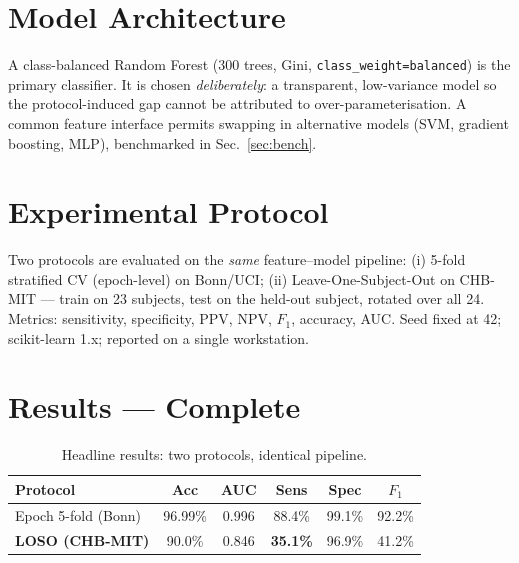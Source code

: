 \documentclass[10pt,journal,twocolumn]{IEEEtran}
\begin{document}
\section{Model Architecture}
A class-balanced Random Forest (300 trees, Gini, \texttt{class\_weight=balanced}) is the primary classifier. It is chosen \emph{deliberately}: a transparent, low-variance model so the protocol-induced gap cannot be attributed to over-parameterisation. A common feature interface permits swapping in alternative models (SVM, gradient boosting, MLP), benchmarked in Sec.~\ref{sec:bench}.

\section{Experimental Protocol}
Two protocols are evaluated on the \emph{same} feature--model pipeline: (i) 5-fold stratified CV (epoch-level) on Bonn/UCI; (ii) Leave-One-Subject-Out on CHB-MIT --- train on 23 subjects, test on the held-out subject, rotated over all 24. Metrics: sensitivity, specificity, PPV, NPV, $F_1$, accuracy, AUC. Seed fixed at 42; scikit-learn 1.x; reported on a single workstation.

\section{Results --- Complete}
\begin{table}[t]\centering\caption{Headline results: two protocols, identical pipeline.}\label{tab:head}
\begin{tabular}{lccccc}\toprule
Protocol & Acc & AUC & Sens & Spec & $F_1$\\\midrule
Epoch 5-fold (Bonn) & 96.99\% & 0.996 & 88.4\% & 99.1\% & 92.2\%\\
\textbf{LOSO (CHB-MIT)} & 90.0\% & 0.846 & \textbf{35.1\%} & 96.9\% & 41.2\%\\\bottomrule
\end{tabular}\end{table}
\end{document}
